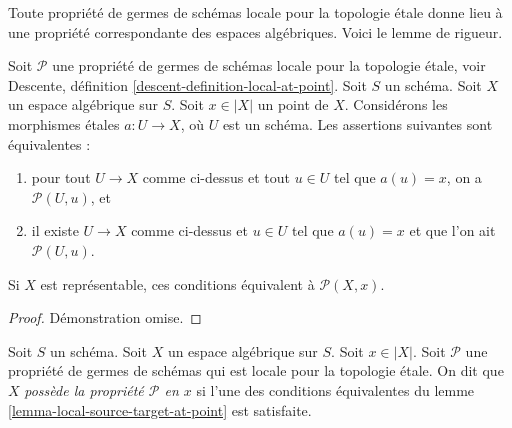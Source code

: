 \noindent
Toute propriété de germes de schémas locale pour la topologie \'etale donne lieu à une
propriété correspondante des espaces algébriques. Voici le lemme de rigueur.

\begin{lemma}
\label{lemma-local-source-target-at-point}
Soit $\mathcal{P}$ une propriété de germes de schémas locale pour la topologie \'etale, voir
Descente, définition \ref{descent-definition-local-at-point}.
Soit $S$ un schéma.
Soit $X$ un espace algébrique sur $S$.
Soit $x \in |X|$ un point de $X$.
Considérons les morphismes \'etales $a : U \to X$, où $U$ est un schéma.
Les assertions suivantes sont équivalentes :
\begin{enumerate}
\item pour tout $U \to X$ comme ci-dessus et tout $u \in U$ tel que $a(u) = x$, on a
$\mathcal{P}(U, u)$, et
\item il existe $U \to X$ comme ci-dessus et $u \in U$ tel que $a(u) = x$ et que l'on ait
$\mathcal{P}(U, u)$.
\end{enumerate}
Si $X$ est représentable, ces conditions équivalent à $\mathcal{P}(X, x)$.
\end{lemma}

\begin{proof}
Démonstration omise.
\end{proof}

\begin{definition}
\label{definition-property-at-point}
Soit $S$ un schéma. Soit $X$ un espace algébrique sur $S$.
Soit $x \in |X|$. Soit $\mathcal{P}$ une propriété de germes de schémas qui est
locale pour la topologie \'etale.
On dit que $X$ {\it possède la propriété $\mathcal{P}$ en $x$} si l'une des
conditions équivalentes du
lemme \ref{lemma-local-source-target-at-point}
est satisfaite.
\end{definition}

